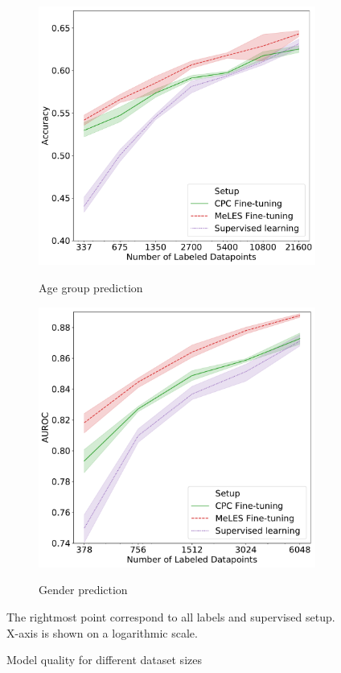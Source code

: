 \documentclass{article}
\begin{document}
\begin{figure}
\begin{subfigure}{0.5\textwidth}
    \label{fig-semi-gender-0}
  \end{subfigure}
  \begin{subfigure}{0.5\textwidth}
    \caption{Age group prediction}
    \includegraphics[width=\textwidth]{figures/ss_age_1_wopl.pdf}
    \label{fig-semi-age-1}
  \end{subfigure}%
  \begin{subfigure}{0.5\textwidth}
    \caption{Gender prediction}
    \includegraphics[width=\textwidth]{figures/ss_gen_1.pdf}
    \label{fig-semi-gender-1}
  \end{subfigure}
  \caption{Model quality for different dataset sizes} \small{The rightmost point correspond to all labels and supervised setup. X-axis is shown on a logarithmic scale.}
\end{figure}
\end{document}
